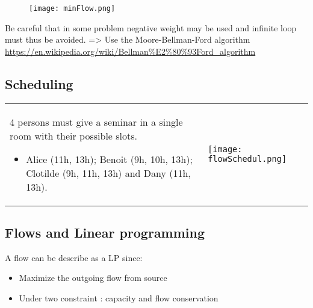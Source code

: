 \begin{figure}[!ht]
    \centering
    \texttt{[image: minFlow.png]}
\end{figure}

Be careful that in some problem negative weight may be used and infinite
loop must thus be avoided. => Use the Moore-Bellman-Ford algorithm
\url{https://en.wikipedia.org/wiki/Bellman%E2%80%93Ford_algorithm} 



\subsection{Scheduling}

\begin{tabular}{m{8cm}m{7cm}}
4 persons must give a seminar in a
single room with their possible slots.
\begin{itemize}
    \item  Alice (11h, 13h); Benoit (9h, 10h, 13h);
        Clotilde (9h, 11h, 13h) and Dany (11h, 13h).
\end{itemize}
&
\texttt{[image: flowSchedul.png]}
\end{tabular}


\subsection{Flows and Linear programming}
A flow can be describe as a LP since:
\begin{itemize}
    \item Maximize the outgoing flow from source
    \item Under two constraint : capacity and flow conservation
\end{itemize}

